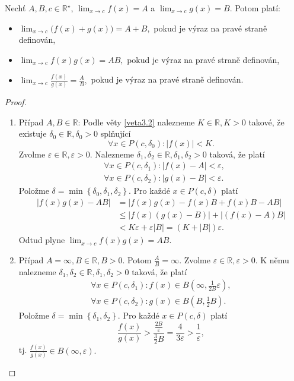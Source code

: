 \begin{veta}\label{veta3.3} %
Nechť $A, B, c \in \mathbb{R}^\star$, $\lim_{x \to c} f(x) = A$ a
$\lim_{x \to c} g(x) = B$. Potom platí:
\begin{itemize}
  \item[(a)]
  $
  \lim_{x \to c} \bigl(f(x) + g(x)\bigr) = A + B,
  $
  pokud je výraz na pravé straně definován,
  \item[(b)]
  $
  \lim_{x \to c} f(x) g(x) = AB,
  $
  pokud je výraz na pravé straně definován,
  \item[(c)]
  $
  \lim_{x \to c} \frac{f(x)}{g(x)} = \frac{A}{B},
  $
  pokud je výraz na pravé straně definován.
\end{itemize}
\end{veta}

\begin{proof}\,
\begin{enumerate}
	\item[(b)] Případ $A,B \in \mathbb R $: Podle věty \ref{veta3.2}
	nalezneme $K\in \mathbb R , K > 0$ takové, že existuje $\delta_0 \in \mathbb R , \delta_0 > 0$ splňující
	$$
	    \forall x \in P(c,\delta_0):|f(x)| < K.
	$$
	Zvolme $\varepsilon \in \mathbb R, \varepsilon > 0$. Nalezneme $\delta_1,\delta_2 \in \mathbb R ,\delta_1, \delta_2 > 0$
	taková, že platí
	\begin{align*}
		&\forall x \in P(c,\delta_1): |f(x)-A|<\varepsilon, \\
		&\forall x \in P(c,\delta_2): |g(x)-B|< \varepsilon.
	\end{align*}
	Položme $\delta = \min \left \{ \delta_0, \delta_1, \delta_2 \right \} $. Pro každé $x\in P(c,\delta)$ platí
	\begin{align*}
	|f(x)g(x)-AB| & = |f(x)g(x)-f(x)B+f(x)B-AB| \\
	& \leq |f(x)(g(x)-B)| + |(f(x)-A)B|\\
	& < K\varepsilon + \varepsilon |B| = (K+|B|)\varepsilon.
\end{align*}
Odtud plyne $\lim_{x\to c} f(x)g(x)=AB.$
\item[(c)] Případ $A = \infty, B\in \mathbb R , B> 0$. Potom $\frac{A}{B}=\infty$. Zvolme $\varepsilon \in \mathbb R ,\varepsilon > 0$.
K němu nalezneme $\delta_1, \delta_2 \in \mathbb R , \delta_1, \delta_2 > 0$ taková, že platí
\begin{align*}
\forall x \in P(c,\delta_1): f(x)\in B\left (\infty, \frac{1}{2B}\varepsilon\right),\\
\forall x \in P(c,\delta_2): g(x) \in B\left(B,\frac{1}{2}B\right).
\end{align*}
    Položme $\delta = \min \left \{ \delta_1, \delta_2 \right \} $. Pro každé $x \in P(c,\delta)$ platí
    $$
    \frac{f(x)}{g(x)}> \frac{\frac{2B}{\varepsilon}}{\frac{3}{2}B} = \frac{4}{3\varepsilon} > \frac{1}{\varepsilon},
    $$
    tj. $\frac{f(x)}{g(x)} \in B(\infty, \varepsilon).$ \qedhere
\end{enumerate}
\end{proof}


